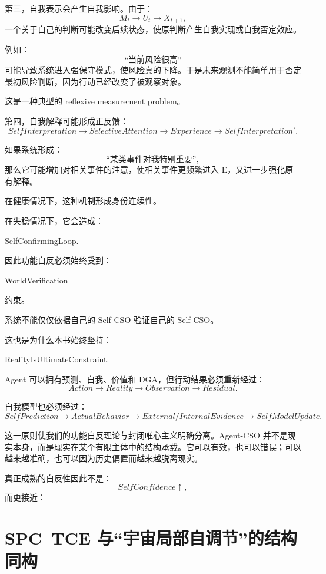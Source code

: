 第三，自我表示会产生自我影响。由于：
\[
M_t
\rightarrow
U_t
\rightarrow
X_{t+1},
\]
一个关于自己的判断可能改变后续状态，使原判断产生自我实现或自我否定效应。

例如：
\[
\text{“当前风险很高”}
\]
可能导致系统进入强保守模式，使风险真的下降。于是未来观测不能简单用于否定最初风险判断，因为行动已经改变了被观察对象。

这是一种典型的 reflexive measurement problem。

第四，自我解释可能形成正反馈：
\[
SelfInterpretation
\rightarrow
SelectiveAttention
\rightarrow
Experience
\rightarrow
SelfInterpretation'.
\]

如果系统形成：
\[
\text{“某类事件对我特别重要”},
\]
那么它可能增加对相关事件的注意，使相关事件更频繁进入 E，又进一步强化原有解释。

在健康情况下，这种机制形成身份连续性。

在失稳情况下，它会造成：
\begin{statementbox}
SelfConfirmingLoop.
\end{statementbox}

因此功能自反必须始终受到：
\begin{statementbox}
WorldVerification
\end{statementbox}
约束。

系统不能仅仅依据自己的 Self-CSO 验证自己的 Self-CSO。

这也是为什么本书始终坚持：
\begin{statementbox}
RealityIsUltimateConstraint.
\end{statementbox}

Agent 可以拥有预测、自我、价值和 DGA，但行动结果必须重新经过：
\[
Action
\rightarrow
Reality
\rightarrow
Observation
\rightarrow
Residual.
\]

自我模型也必须经过：
\[
SelfPrediction
\rightarrow
ActualBehavior
\rightarrow
External/InternalEvidence
\rightarrow
SelfModelUpdate.
\]

这一原则使我们的功能自反理论与封闭唯心主义明确分离。Agent-CSO 并不是现实本身，而是现实在某个有限主体中的结构承载。它可以有效，也可以错误；可以越来越准确，也可以因为历史偏置而越来越脱离现实。

真正成熟的自反性因此不是：
\[
SelfConfidence\uparrow,
\]
而更接近：
\begin{statementbox}
\centering
{}
\end{statementbox}

\section{SPC--TCE 与“宇宙局部自调节”的结构同构}

